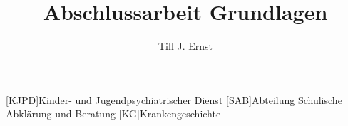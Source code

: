 


\title{Abschlussarbeit Grundlagen}
\author{Till J. Ernst}






\tableofcontents
\newpage

\begin{acronym}[KJPD]
[KJPD]{Kinder- und Jugendpsychiatrischer Dienst}
[SAB]{Abteilung Schulische Abklärung und Beratung}
[KG]{Krankengeschichte}
\end{acronym}
\newpage








\begin{flushleft}
{}
\end{flushleft}


%
%
%